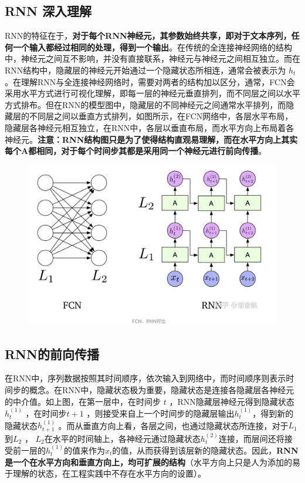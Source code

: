 \documentclass[12pt]{article}
\begin{document}
\subsection{RNN 深入理解\cite{Deep_Understand_RNN_And_LSTM}}
RNN的特征在于，\textbf{对于每个RNN神经元，其参数始终共享，即对于文本序列，任何一个输入都经过相同的处理，得到一个输出}。在传统的全连接神经网络的结构中，神经元之间互不影响，并没有直接联系，神经元与神经元之间相互独立。而在RNN结构中，隐藏层的神经元开始通过一个隐藏状态所相连，通常会被表示为 $h_t$ 。在理解RNN与全连接神经网络时，需要对两者的结构加以区分，通常，FCN会采用水平方式进行可视化理解，即每一层的神经元垂直排列，而不同层之间以水平方式排布。但在RNN的模型图中，隐藏层的不同神经元之间通常水平排列，而隐藏层的不同层之间以垂直方式排列，如图所示，在FCN网络中，各层水平布局，隐藏层各神经元相互独立，在RNN中，各层以垂直布局，而水平方向上布局着各神经元。\textbf{注意：RNN结构图只是为了使得结构直观易理解，而在水平方向上其实每个A都相同，对于每个时间步其都是采用同一个神经元进行前向传播}。
\begin{figure}[H]
    \centering
    \includegraphics[width=.6\textwidth]{fig/RNN_Compare_FCN_RNN_Structure.png}
\end{figure}

\subsection{RNN的前向传播}
在RNN中，序列数据按照其时间顺序，依次输入到网络中，而时间顺序则表示时间步的概念。在RNN中，隐藏状态极为重要，隐藏状态是连接各隐藏层各神经元的中介值。如上图，在第一层中，在时间步 $t$ ，RNN隐藏层神经元得到隐藏状态$h_t^{(1)}$ ，在时间步$t+1$ ，则接受来自上一个时间步的隐藏层输出$h_t^{(1)}$，得到新的隐藏状态$h_{t+1}^{(1)}$ 。而从垂直方向上看，各层之间，也通过隐藏状态所连接，对于$L_1$ 到$L_2$ ， $L_2$在水平的时间轴上，各神经元通过隐藏状态$h_t^{(2)}$连接，而层间还将接受前一层的$h_t^{(1)}$的值来作为$x_t$的值，从而获得到该层新的隐藏状态。因此，\textbf{RNN是一个在水平方向和垂直方向上，均可扩展的结构}（水平方向上只是人为添加的易于理解的状态，在工程实践中不存在水平方向的设置）。
\end{document}
